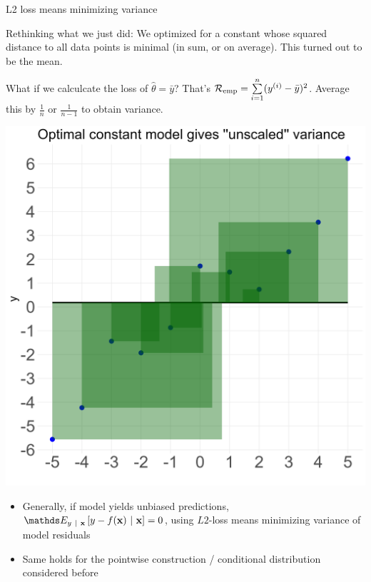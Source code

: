 \documentclass[11pt,compress,t,notes=noshow, xcolor=table]{beamer}
\begin{document}
\begin{vbframe}{L2 loss means minimizing variance}

Rethinking what we just did:
We optimized for a constant whose squared distance to all data points is minimal
(in sum, or on average). This turned out to be the mean.

\vspace{0.1cm}

What if we calculcate the loss of $\hat{\theta} = \bar{y}$? That's ${\textstyle \mathcal{R}_{\text{emp}} = \sum\limits_{i=1}^n (y^{(i)} - \bar{y})^2}$. Average this by $\frac{1}{n}$ or $\frac{1}{n-1}$ 
to obtain variance. 

\vspace{0.2cm}


\begin{minipage}{0.5\textwidth}
    \centering
    \includegraphics[width=0.9\linewidth]{figure_man/plot_const_var.png}
\end{minipage}%
\begin{minipage}{0.5\textwidth}
    \begin{itemize}
    \small
        \item  Generally, if model yields unbiased predictions, { $\E_{y~|~\xv}\left[y-\fx~|~\xv\right]=0$}, using $L2$-loss means minimizing variance of model residuals
        \item Same holds for the pointwise construction / conditional distribution considered before
     \end{itemize}
\end{minipage}



\end{vbframe}
\end{document}
